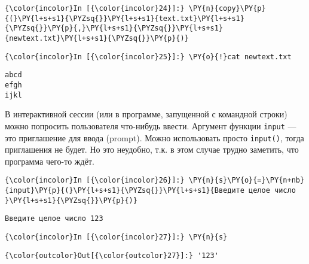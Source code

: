     \begin{Verbatim}[commandchars=\\\{\}]
{\color{incolor}In [{\color{incolor}24}]:} \PY{n}{copy}\PY{p}{(}\PY{l+s+s1}{\PYZsq{}}\PY{l+s+s1}{text.txt}\PY{l+s+s1}{\PYZsq{}}\PY{p}{,}\PY{l+s+s1}{\PYZsq{}}\PY{l+s+s1}{newtext.txt}\PY{l+s+s1}{\PYZsq{}}\PY{p}{)}
\end{Verbatim}

    \begin{Verbatim}[commandchars=\\\{\}]
{\color{incolor}In [{\color{incolor}25}]:} \PY{o}{!}cat newtext.txt
\end{Verbatim}

    \begin{Verbatim}[commandchars=\\\{\}]
abcd
efgh
ijkl

    \end{Verbatim}

    В интерактивной сессии (или в программе, запущенной с командной строки)
можно попросить пользователя что-нибудь ввести. Аргумент функции
\texttt{input} --- это приглашение для ввода (prompt). Можно использовать
просто \texttt{input()}, тогда приглашения не будет. Но это неудобно,
т.к. в этом случае трудно заметить, что программа чего-то ждёт.

    \begin{Verbatim}[commandchars=\\\{\}]
{\color{incolor}In [{\color{incolor}26}]:} \PY{n}{s}\PY{o}{=}\PY{n+nb}{input}\PY{p}{(}\PY{l+s+s1}{\PYZsq{}}\PY{l+s+s1}{Введите целое число }\PY{l+s+s1}{\PYZsq{}}\PY{p}{)}
\end{Verbatim}

    \begin{Verbatim}[commandchars=\\\{\}]
Введите целое число 123

    \end{Verbatim}

    \begin{Verbatim}[commandchars=\\\{\}]
{\color{incolor}In [{\color{incolor}27}]:} \PY{n}{s}
\end{Verbatim}

            \begin{Verbatim}[commandchars=\\\{\}]
{\color{outcolor}Out[{\color{outcolor}27}]:} '123'
\end{Verbatim}
        
